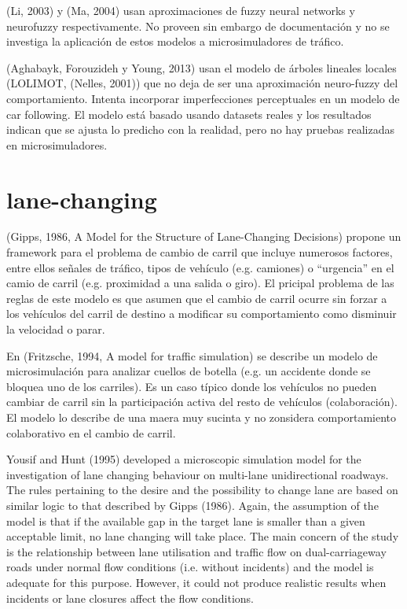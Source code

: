 (Li, 2003) y (Ma, 2004) usan aproximaciones de fuzzy neural networks y neurofuzzy respectivamente. No proveen sin embargo de documentación y no se investiga la aplicación de estos modelos a microsimuladores de tráfico.

(Aghabayk, Forouzideh y Young, 2013) usan el modelo de árboles lineales locales (LOLIMOT, (Nelles, 2001)) que no deja de ser una aproximación neuro-fuzzy del comportamiento. Intenta incorporar imperfecciones perceptuales en un modelo de car following. El modelo está basado usando datasets reales y los resultados indican que se ajusta lo predicho con la realidad, pero no hay pruebas realizadas en microsimuladores.


\section{lane-changing}

(Gipps, 1986, A Model for the Structure of Lane-Changing Decisions) propone un framework para el problema de cambio de carril que incluye numerosos factores, entre ellos señales de tráfico, tipos de vehículo (e.g. camiones) o \enquote{urgencia} en el camio de carril (e.g. proximidad a una salida o giro). El pricipal problema de las reglas de este modelo es que asumen que el cambio de carril ocurre sin forzar a los vehículos del carril de destino a modificar su comportamiento como disminuir la velocidad o parar.

En (Fritzsche, 1994, A model for traffic simulation) se describe un modelo de microsimulación para analizar cuellos de botella (e.g. un accidente donde se bloquea uno de los carriles). Es un caso típico donde los vehículos no pueden cambiar de carril sin la participación activa del resto de vehículos (colaboración). El modelo lo describe de una maera muy sucinta y no zonsidera comportamiento colaborativo en el cambio de carril.

Yousif and Hunt (1995) developed a microscopic simulation model for the investigation of lane changing behaviour on multi-lane unidirectional roadways. The rules pertaining to the desire and the possibility to change lane are based on similar logic to that described by Gipps (1986). Again, the assumption of the model is that if the available gap in the target lane is smaller than a given acceptable limit, no lane changing will take place. The main concern of the study is the relationship between lane utilisation and traffic flow on dual-carriageway roads under normal flow conditions (i.e. without incidents) and the model is adequate for this purpose. However, it could not produce realistic results when incidents or lane closures affect the flow conditions.

